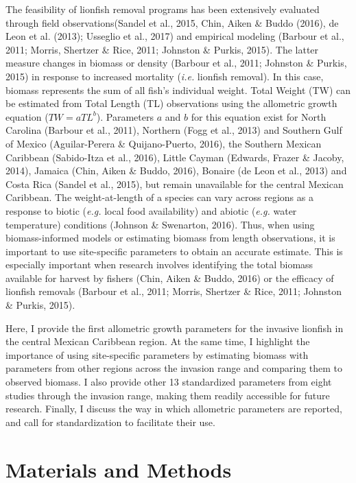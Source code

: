 \documentclass[12pt,]{article}
\begin{document}
The feasibility of lionfish removal programs has been extensively
evaluated through field observations(Sandel et al., 2015, Chin, Aiken \&
Buddo (2016), de Leon et al. (2013); Usseglio et al., 2017) and
empirical modeling (Barbour et al., 2011; Morris, Shertzer \& Rice,
2011; Johnston \& Purkis, 2015). The latter measure changes in biomass
or density (Barbour et al., 2011; Johnston \& Purkis, 2015) in response
to increased mortality (\emph{i.e.} lionfish removal). In this case,
biomass represents the sum of all fish's individual weight. Total Weight
(TW) can be estimated from Total Length (TL) observations using the
allometric growth equation (\(TW = aTL^b\)). Parameters \(a\) and \(b\)
for this equation exist for North Carolina (Barbour et al., 2011),
Northern (Fogg et al., 2013) and Southern Gulf of Mexico (Aguilar-Perera
\& Quijano-Puerto, 2016), the Southern Mexican Caribbean (Sabido-Itza et
al., 2016), Little Cayman (Edwards, Frazer \& Jacoby, 2014), Jamaica
(Chin, Aiken \& Buddo, 2016), Bonaire (de Leon et al., 2013) and Costa
Rica (Sandel et al., 2015), but remain unavailable for the central
Mexican Caribbean. The weight-at-length of a species can vary across
regions as a response to biotic (\emph{e.g.} local food availability)
and abiotic (\emph{e.g.} water temperature) conditions (Johnson \&
Swenarton, 2016). Thus, when using biomass-informed models or estimating
biomass from length observations, it is important to use site-specific
parameters to obtain an accurate estimate. This is especially important
when research involves identifying the total biomass available for
harvest by fishers (Chin, Aiken \& Buddo, 2016) or the efficacy of
lionfish removals (Barbour et al., 2011; Morris, Shertzer \& Rice, 2011;
Johnston \& Purkis, 2015).

Here, I provide the first allometric growth parameters for the invasive
lionfish in the central Mexican Caribbean region. At the same time, I
highlight the importance of using site-specific parameters by estimating
biomass with parameters from other regions across the invasion range and
comparing them to observed biomass. I also provide other 13 standardized
parameters from eight studies through the invasion range, making them
readily accessible for future research. Finally, I discuss the way in
which allometric parameters are reported, and call for standardization
to facilitate their use.

\section{Materials and Methods}\label{materials-and-methods}
\end{document}

